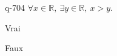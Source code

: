 \begin{truefalse}{q-704}
$\forall x \in \mathbb R,\:\exists y \in \mathbb R,\: x>y$.
\item* Vrai
\item Faux
\end{truefalse}


